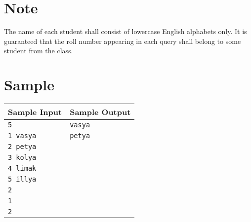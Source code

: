 \documentclass{article}
\begin{document}
\section*{Note}

The name of each student shall consist of lowercase English alphabets only. It is guaranteed that the roll number appearing in each query shall belong to some student from the class.

\section*{Sample}

\begin{tabular}{l|l}
    \hline
    \hline
    Sample Input & Sample Output \\
    \hline
    \verb+5+ & \verb+vasya+ \\
    \verb+1 vasya+ & \verb+petya+ \\
    \verb+2 petya+ & \verb++ \\
    \verb+3 kolya+ & \verb++ \\
    \verb+4 limak+ & \verb++ \\
    \verb+5 illya+ & \verb++ \\
    \verb+2+ & \verb++ \\
    \verb+1+ & \verb++ \\
    \verb+2+ & \verb++ \\
    \hline
\end{tabular}
\end{document}
